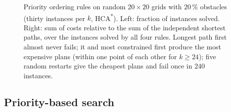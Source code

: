 \begin{figure}[tb]
  \centering
  \caption{Priority ordering rules on random $20 \times 20$ grids with $20\,\%$
  obstacles (thirty instances per $k$, HCA\textsuperscript{*}). Left: fraction of
  instances solved. Right: sum of costs relative to the sum of the independent
  shortest paths, over the instances solved by all four rules. Longest path first
  almost never fails; it and most constrained first produce the most expensive plans
  (within one point of each other for $k \ge 24$); five random restarts give the
  cheapest plans and fail once in $240$ instances.}
  \label{fig:ch08-orders}
\end{figure}

\subsection{Priority-based search}
\label{sec:ch08-pbs}

